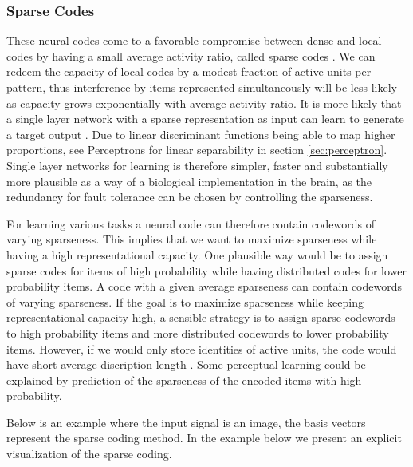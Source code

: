 \subsubsection{Sparse Codes}

These neural codes come to a favorable compromise between dense and local codes by having a small average activity ratio, called sparse codes \cite{scprimate}. We can redeem the capacity of local codes by a modest fraction of active units per pattern, thus interference by items represented simultaneously will be less likely as capacity grows exponentially with average activity ratio. It is more likely that a single layer network with a sparse representation as input can learn to generate a target output \cite{willshaw}. Due to linear discriminant functions being able to map higher proportions, see Perceptrons for linear separability in section \ref{sec:perceptron}. Single layer networks for learning is therefore simpler, faster and substantially more plausible as a way of a biological implementation in the brain, as the redundancy for fault tolerance can be chosen by controlling the sparseness.

For learning various tasks a neural code can therefore contain codewords of varying sparseness. This implies that we want to maximize sparseness while having a high representational capacity. One plausible way would be to assign sparse codes for items of high probability while having distributed codes for lower probability items.
A code with a given average sparseness can contain codewords of varying sparseness. If the goal is to maximize sparseness while keeping representational capacity high, a sensible strategy is to assign sparse codewords to high probability items and more distributed codewords to lower probability items. However, if we would only store identities of active units, the code would have short average discription length \cite{cover}. Some perceptual learning could be explained by prediction of the sparseness of the encoded items with high probability.

Below is an example where the input signal is an image, the basis vectors represent the sparse coding method. In the example below we present an explicit visualization of the sparse coding. 

